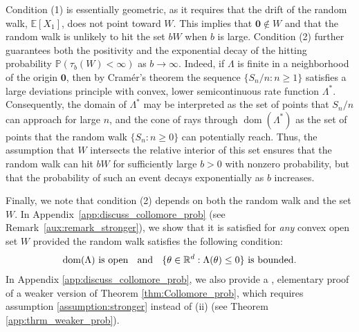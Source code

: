 \documentclass[aap,preprint]{imsart}
\newcommand{\Pro}{{\mathbb{P}}}
\newcommand{\Exp}{{\mathbb{E}}}
\newcommand{\bR}{{\mathbb{R}}}
\theoremstyle{plain}
\theoremstyle{definition}
\begin{document}
Condition (1) is essentially geometric, as it requires that the drift of the random walk, $\Exp[X_1]$, does not point toward $W$. This implies that $\mathbf{0} \notin W$ and that the random walk is unlikely to hit the set $bW$ when $b$ is large. Condition (2) further guarantees both the positivity and the exponential decay of the hitting probability $\Pro(\tau_b(W) < \infty)$ as $b \to \infty$. Indeed, if $\Lambda$ is finite in a neighborhood of the origin $\mathbf{0}$, then by Cram\'er's theorem \cite[Corollary~6.1.6]{dembo2009large} the sequence $\{S_n/n : n \geq 1\}$ satisfies a large deviations principle with convex, lower semicontinuous rate function $\Lambda^*$. Consequently, the domain of $\Lambda^*$ may be interpreted as the set of points that $S_n/n$ can approach for large $n$, and the cone of rays through $\operatorname{dom}(\Lambda^*)$ as the set of points that the random walk $\{S_n : n \geq 0\}$ can potentially reach. Thus, the assumption that $W$ intersects the relative interior of this set ensures that the random walk can hit $bW$ for sufficiently large $b > 0$ with nonzero probability, but that the probability of such an event decays exponentially as $b$ increases.

Finally, we note that condition (2) depends on both the random walk and the set $W$. In Appendix~\ref{app:discuss_collomore_prob} (see Remark~\ref{aux:remark_stronger}), we show that it is satisfied for \emph{any} convex open set $W$ provided the random walk satisfies the following condition:
\begin{align}
\label{assumption:stronger}
\operatorname{dom}(\Lambda) \text{ is open \;  and \;  } \{\theta \in \bR^d : \Lambda(\theta) \leq 0\} \text{ is bounded.}
\end{align}
In Appendix \ref{app:discuss_collomore_prob}, we also provide a , elementary proof of a weaker version of Theorem \ref{thm:Collomore_prob}, which requires assumption  \eqref{assumption:stronger} instead of (ii)
 (see Theorem \ref{app:thrm_weaker_prob}). %
\end{document}
